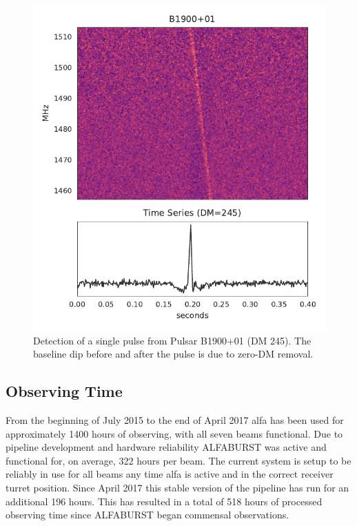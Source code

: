 \documentclass[a4paper,fleqn,usenatbib]{mnras}
\begin{document}
\begin{figure}
    \includegraphics[width=1.0\linewidth]{figures/B1900_01.pdf}
    \caption{Detection of a single pulse from Pulsar B1900+01 (DM 245). The
    baseline dip before and after the pulse is due to zero-DM removal.
    }
    \label{fig:B1900}
\end{figure}



\subsection{Observing Time}
\label{sec:obs_time}

From the beginning of July 2015 to the end of April 2017 \gls*{alfa} has been
used for approximately 1400 hours of observing, with all seven beams functional.
Due to pipeline development and hardware reliability ALFABURST was active and
functional for, on average, 322 hours per beam.  The current system is setup to
be reliably in use for all beams any time \gls*{alfa} is active and in the
correct receiver turret position. Since April 2017 this stable version of the
pipeline has run for an additional 196 hours. This has resulted in a total of
518 hours of processed observing time since ALFABURST began commensal observations.
\end{document}
